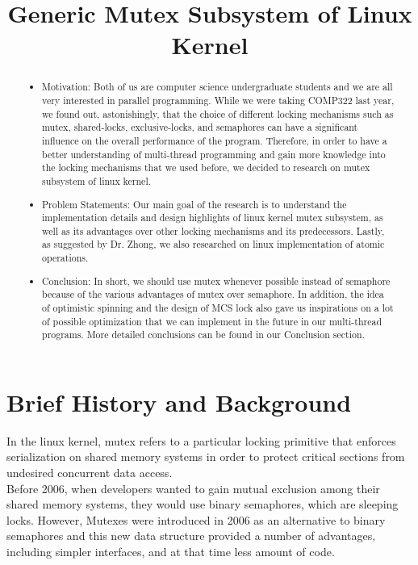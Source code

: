 \documentclass[10pt]{sigplanconf}
\date{}
\begin{document}
\title{Generic Mutex Subsystem of Linux Kernel} 
\maketitle

\begin{abstract}

\begin{itemize}
	\item Motivation: Both of us are computer science undergraduate students and we are all very interested in parallel programming. While we were taking COMP322 last year, we found out, astonishingly, that the choice of different locking mechanisms such as mutex, shared-locks, exclusive-locks, and semaphores can have a significant influence on the overall performance of the program. Therefore, in order to have a better understanding of multi-thread programming and gain more knowledge into the locking mechanisms that we used before, we decided to research on mutex subsystem of linux kernel.
	\item Problem Statements: Our main goal of the research is to understand the implementation details and design highlights of linux kernel mutex subsystem, as well as its advantages over other locking mechanisms and its predecessors. Lastly, as suggested by Dr. Zhong, we also researched on linux implementation of atomic operations. 
	\item Conclusion: In short, we should use mutex whenever possible instead of semaphore because of the various advantages of mutex over semaphore. In addition, the idea of optimistic spinning and the design of MCS lock also gave us inspirations on a lot of possible optimization that we can implement in the future in our multi-thread programs. More detailed conclusions can be found in our Conclusion section.
		
\end{itemize}

\end{abstract}


\vspace{80pt}

\section{Brief History and Background}

In the linux kernel, mutex refers to a particular locking primitive that enforces serialization on shared memory systems in order to protect critical sections from undesired concurrent data access. \\
Before 2006, when developers wanted to gain mutual exclusion among their shared memory systems, they would use binary semaphores, which are sleeping locks. However, Mutexes were introduced in 2006 as an alternative to binary semaphores and this new data structure provided a number of advantages, including simpler interfaces, and at that time less amount of code. 
\end{document}
